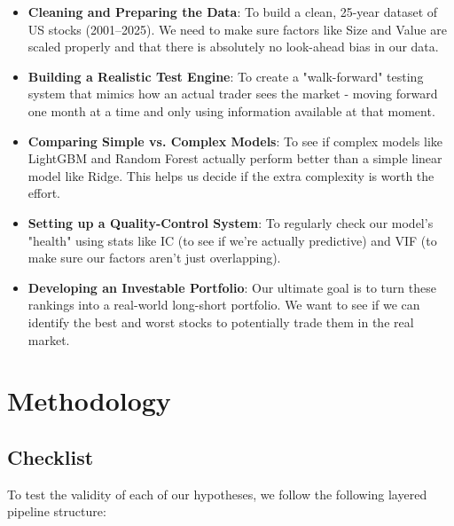 \documentclass[11pt]{article}
\begin{document}
\begin{itemize}
    \item \textbf{Cleaning and Preparing the Data}: To build a clean, 25-year dataset of US stocks (2001--2025). We need to make sure factors like Size and Value are scaled properly and that there is absolutely no look-ahead bias in our data.
    \item \textbf{Building a Realistic Test Engine}: To create a "walk-forward" testing system that mimics how an actual trader sees the market - moving forward one month at a time and only using information available at that moment.
    \item \textbf{Comparing Simple vs. Complex Models}: To see if complex models like LightGBM and Random Forest actually perform better than a simple linear model like Ridge. This helps us decide if the extra complexity is worth the effort.
    \item \textbf{Setting up a Quality-Control System}: To regularly check our model's "health" using stats like IC (to see if we're actually predictive) and VIF (to make sure our factors aren't just overlapping).
    \item \textbf{Developing an Investable Portfolio}: Our ultimate goal is to turn these rankings into a real-world long-short portfolio. We want to see if we can identify the best and worst stocks to potentially trade them in the real market.
\end{itemize}


\section{Methodology}

\subsection{Checklist}
To test the validity of each of our hypotheses, we follow the following layered pipeline structure:
\end{document}

